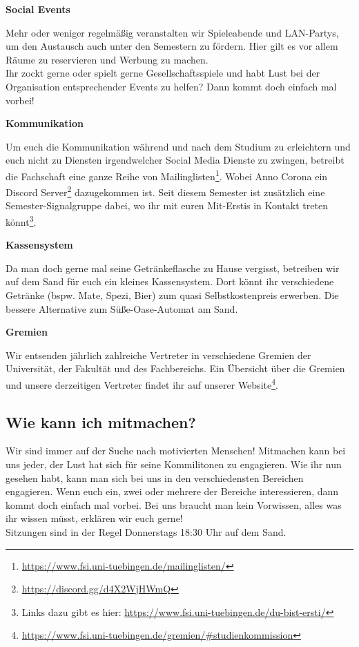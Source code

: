 \vfill \pagebreak
\textbf{Social Events}

Mehr oder weniger regelmäßig veranstalten wir Spieleabende und LAN-Partys, um
den Austausch auch unter den Semestern zu fördern. Hier gilt es vor allem Räume
zu reservieren und Werbung zu machen. \\
Ihr zockt gerne oder spielt gerne Gesellschaftsspiele und habt Lust bei der
Organisation entsprechender Events zu helfen? Dann kommt doch einfach mal
vorbei!

\textbf{Kommunikation}

Um euch die Kommunikation während und nach dem Studium zu erleichtern und euch
nicht zu Diensten irgendwelcher Social Media Dienste zu zwingen, betreibt die
Fachschaft eine ganze Reihe von
Mailinglisten\footnote{\url{https://www.fsi.uni-tuebingen.de/mailinglisten/}}.
Wobei Anno Corona ein Discord Server\footnote{\url{https://discord.gg/d4X2WjHWmQ}}
dazugekommen ist.
Seit diesem Semester ist zusätzlich eine Semester-Signalgruppe dabei, wo ihr mit euren Mit-Erstis in Kontakt treten könnt\footnote{Links dazu gibt es hier: \url{https://www.fsi.uni-tuebingen.de/du-bist-ersti/}}.

\textbf{Kassensystem}

Da man doch gerne mal seine Getränkeflasche zu Hause
vergisst, betreiben wir auf dem Sand für euch ein kleines Kassensystem.
Dort könnt ihr verschiedene Getränke (bspw. Mate, Spezi, Bier) zum quasi Selbstkostenpreis
erwerben. Die bessere Alternative zum Süße-Oase-Automat am Sand.

\textbf{Gremien}

Wir entsenden jährlich zahlreiche Vertreter in verschiedene Gremien der
Universität, der Fakultät und des Fachbereichs. Ein Übersicht über die Gremien
und unsere derzeitigen Vertreter findet ihr auf unserer
Website\footnote{\url{https://www.fsi.uni-tuebingen.de/gremien/\#studienkommission}}.
\\

%
\subsection{Wie kann ich mitmachen?}
Wir sind immer auf der Suche nach motivierten Menschen! Mitmachen kann bei uns
jeder, der Lust hat sich für seine Kommilitonen zu engagieren. Wie ihr nun
gesehen habt, kann man sich bei uns in den verschiedensten Bereichen
engagieren. Wenn euch ein, zwei oder mehrere der Bereiche interessieren, dann
kommt doch einfach mal vorbei. Bei uns braucht man kein Vorwissen, alles was
ihr wissen müsst, erklären wir euch gerne!\\
Sitzungen sind in der Regel Donnerstags 18:30 Uhr auf dem Sand.

